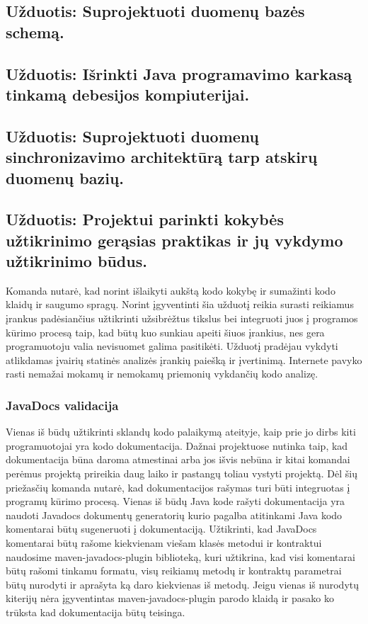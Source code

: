 \documentclass{VUMIFPSkursinis}
\begin{document}
		
	
		
	\subsection{Užduotis: Suprojektuoti duomenų bazės schemą.}

	\subsection{Užduotis: Išrinkti Java programavimo karkasą tinkamą debesijos kompiuterijai.}

	\subsection{Užduotis: Suprojektuoti duomenų sinchronizavimo architektūrą tarp atskirų duomenų bazių.}

	\subsection{Užduotis: Projektui parinkti kokybės užtikrinimo gerąsias praktikas ir jų vykdymo užtikrinimo būdus.}
		Komanda nutarė, kad norint išlaikyti aukštą kodo kokybę ir sumažinti kodo klaidų ir saugumo spragų.
		Norint įgyventinti šia užduotį reikia surasti reikiamus įrankus padėsiančius užtikrinti užsibrėžtus tikslus bei integruoti juos į programos kūrimo
		procesą taip, kad būtų kuo sunkiau apeiti šiuos įrankius, nes gera programuotoju valia nevisuomet galima pasitikėti.
		Užduotį pradėjau vykdyti atlikdamas įvairių statinės analizės įrankių paiešką ir įvertinimą.
		Internete pavyko rasti nemažai mokamų ir nemokamų priemonių vykdančių kodo analizę.
		
		\subsubsection{JavaDocs validacija}
			Vienas iš būdų užtikrinti sklandų kodo palaikymą ateityje, kaip prie jo dirbs kiti programuotojai yra kodo dokumentacija.
			Dažnai projektuose nutinka taip, kad dokumentacija būna daroma atmestinai arba jos išvis nebūna ir kitai komandai perėmus projektą prireikia daug 
			laiko ir pastangų toliau vystyti projektą.
			Dėl šių priežasčių komanda nutarė, kad dokumentacijos rašymas turi būti integruotas į programų kūrimo procesą.
			Vienas iš būdų Java kode rašyti dokumentacija yra naudoti Javadocs dokumentų generatorių kurio pagalba atitinkami Java kodo komentarai būtų 
			sugeneruoti į dokumentaciją. Užtikrinti, kad JavaDocs komentarai būtų rašome kiekvienam viešam klasės metodui ir kontraktui naudosime  maven-javadocs-plugin biblioteką, kuri užtikrina, kad visi komentarai būtų rašomi tinkamu formatu, visų reikiamų metodų ir kontraktų parametrai būtų nurodyti ir aprašyta ką daro kiekvienas iš metodų.
			Jeigu vienas iš nurodytų kiterijų nėra įgyventintas maven-javadocs-plugin parodo klaidą ir pasako ko trūksta kad dokumentacija būtų teisinga.
\end{document}
